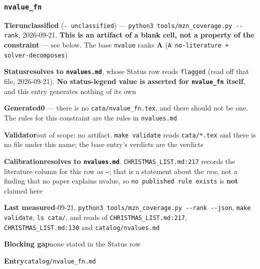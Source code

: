 \documentclass[10pt,a4paper]{article}
\newcommand{\entryfield}[2]{{\raggedright\textbf{#1}\quad #2\par}}
\begin{document}
\subsubsection*{\texttt{nvalue\_\allowbreak{}fn}}
\label{entry:nvalue-fn}
\entryfield{Tier}{\textbf{unclassified} (\texttt{- unclassified}) --- \texttt{python3 tools/\allowbreak{}mzn\_\allowbreak{}coverage.\allowbreak{}py -\allowbreak{}-\allowbreak{}rank}, 2026-09-21. \textbf{This is an artifact of a blank cell, not a property of the constraint} --- see below. The base \texttt{nvalue} ranks \textbf{A} (\texttt{A no-\allowbreak{}literature + solver-\allowbreak{}decomposes})}
\entryfield{Status}{\textbf{resolves to \texttt{nvalues.md}}, whose Status row reads \texttt{flagged} (read off that file, 2026-09-21). \textbf{No status-legend value is asserted for \texttt{nvalue\_fn} itself}, and this entry generates nothing of its own}
\entryfield{Generated}{\textbf{0} --- there is no \texttt{cata/nvalue\_fn.tex}, and there should not be one. The rules for this constraint are the rules in \texttt{nvalues.md}}
\entryfield{Validator}{out of scope: no artifact. \texttt{make validate} reads \texttt{cata/*.tex} and there is no file under this name; the base entry's verdicts are the verdicts}
\entryfield{Calibration}{\textbf{resolves to \texttt{nvalues.md}}. \texttt{CHRISTMAS\_LIST.md:217} records the literature column for this row as \texttt{---}; that is a statement about the \emph{row}, not a finding that no paper explains nvalue, so \texttt{no published rule exists} is \textbf{not} claimed here}
\entryfield{Last measured}{2026-09-21, \texttt{python3 tools/\allowbreak{}mzn\_\allowbreak{}coverage.\allowbreak{}py -\allowbreak{}-\allowbreak{}rank -\allowbreak{}-\allowbreak{}json}, \texttt{make validate}, \texttt{ls cata/}, and reads of \texttt{CHRISTMAS\_LIST.md:217}, \texttt{CHRISTMAS\_LIST.md:130} and \texttt{catalog/nvalues.md}}
\entryfield{Blocking gap}{none stated in the Status row}
\entryfield{Entry}{\texttt{catalog/nvalue\_fn.md}}
\end{document}
